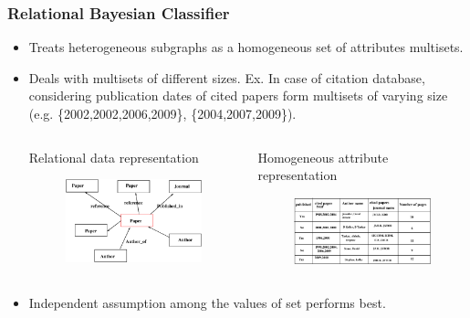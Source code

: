 \documentclass[10pt, blue,subsection=true, compress]{beamer}
\begin{document}
\begin{frame}\frametitle{Relational Bayesian Classifier}
\begin{itemize}
\item Treats heterogeneous subgraphs as a homogeneous set of attributes multisets.
\item Deals with multisets of different sizes. Ex. In case of citation database, considering publication dates of cited papers form multisets of varying size (e.g. 
\{2002,2002,2006,2009\}, \{2004,2007,2009\}). 
\begin{columns}[t]
\begin{block}{Relational data representation}
\begin{figure}[htbp]
\centering
\includegraphics[scale=0.2]{img/rbc.eps}
\end{figure}
\end{block}
\begin{block}{Homogeneous attribute representation}
\begin{figure}[htbp]
\centering
\includegraphics[scale=0.2]{img/rbc2.eps}
\end{figure}
\end{block}
\end{columns}
\item Independent assumption among the values of set performs best. 
\end{itemize}
\end{frame}
\end{document}
